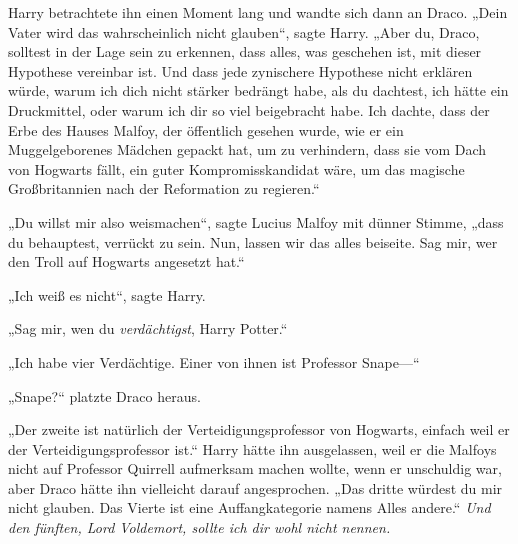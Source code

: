 Harry betrachtete ihn einen Moment lang und wandte sich dann an Draco.
„Dein Vater wird das wahrscheinlich nicht glauben“, sagte Harry. „Aber du, Draco, solltest in der Lage sein zu erkennen, dass alles, was geschehen ist, mit dieser Hypothese vereinbar ist. Und dass jede zynischere Hypothese nicht erklären würde, warum ich dich nicht stärker bedrängt habe, als du dachtest, ich hätte ein Druckmittel, oder warum ich dir so viel beigebracht habe. Ich dachte, dass der Erbe des Hauses Malfoy, der öffentlich gesehen wurde, wie er ein Muggelgeborenes Mädchen gepackt hat, um zu verhindern, dass sie vom Dach von Hogwarts fällt, ein guter Kompromisskandidat wäre, um das magische Großbritannien nach der Reformation zu regieren.“

„Du willst mir also weismachen“, sagte Lucius Malfoy mit dünner Stimme, „dass du behauptest, verrückt zu sein. Nun, lassen wir das alles beiseite. Sag mir, wer den Troll auf Hogwarts angesetzt hat.“

„Ich weiß es nicht“, sagte Harry.

„Sag mir, wen du \emph{verdächtigst}, Harry Potter.“

„Ich habe vier Verdächtige. Einer von ihnen ist Professor Snape—“

„Snape?“ platzte Draco heraus.

„Der zweite ist natürlich der Verteidigungsprofessor von Hogwarts, einfach weil er der Verteidigungsprofessor ist.“ Harry hätte ihn ausgelassen, weil er die Malfoys nicht auf Professor Quirrell aufmerksam machen wollte, wenn er unschuldig war, aber Draco hätte ihn vielleicht darauf angesprochen.
„Das dritte würdest du mir nicht glauben. Das Vierte ist eine Auffangkategorie namens Alles andere.“
\emph{Und den fünften, Lord Voldemort, sollte ich dir wohl nicht nennen.}

